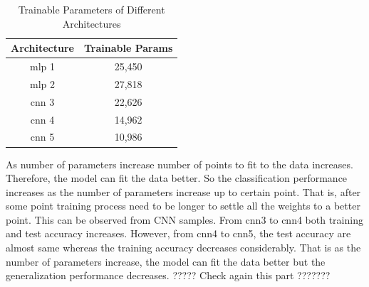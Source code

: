 \documentclass{assignment}
\begin{document}
\begin{table}[h]
    \centering
    \begin{tabular}{|c|c|}
    \hline
    \textbf{Architecture} & \textbf{Trainable Params} \\
    \hline
    mlp 1 & 25,450 \\
    mlp 2 & 27,818 \\
    cnn 3 & 22,626 \\
    cnn 4 & 14,962 \\
    cnn 5 & 10,986 \\
    \hline
    \end{tabular}
    \caption{Trainable Parameters of Different Architectures}
    \label{table:TrinableParams}
\end{table}


As number of parameters increase number of points to fit to the data increases. Therefore, the model can fit the data better. So the classification performance increases as the number of parameters increase up to certain point. That is, after some point training process need to be longer to settle all the weights to a better point. This can be observed from CNN samples. From cnn3 to cnn4 both training and test accuracy increases. However, from cnn4 to cnn5, the test accuracy are almost same whereas the training accuracy decreases considerably. That is as the number of parameters increase, the model can fit the data better but the generalization performance decreases. ????? Check again this part ???????
\end{document}
